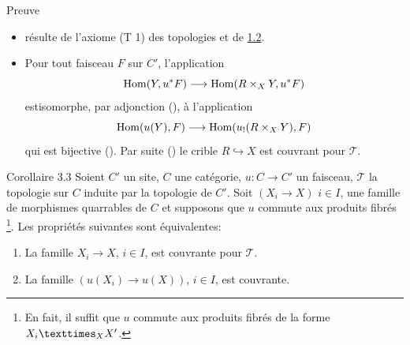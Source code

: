 \documentclass[10pt]{../fichiers-configuration-latex/smfart}
\begin{document}
\begin{enonce*}[remark]{Preuve}
\begin{itemize} %
\item[i) $\Rightarrow$ ii):] résulte de l'axiome (T 1) des topologies
  et de \hyperref[III.prop1.2]{1.2}.

\item[ii) $\Rightarrow$ i):] Pour tout faisceau $F$ sur $C'$,
  l'application
$$
\operatorname{Hom}(Y,u^{\ast}F)\longrightarrow \operatorname{Hom}(R\times_X Y, u^{\ast}F)
$$
est\pageoriginale isomorphe, par adjonction (), à
l'application
$$
\operatorname{Hom}(u(Y),F)\longrightarrow \operatorname{Hom}(u_{!}(R\times_X Y),F)
$$
qui est bijective (). Par suite ()
le crible $R\hookrightarrow X$ est couvrant pour $𝒯$.
\end{itemize}
\end{enonce*}

\begin{enonce*}{Corollaire 3.3}
Soient $C'$ un site, $C$ une catégorie, $u:C\rightarrow C'$ un
faisceau, $𝒯$ la topologie sur $C$ induite par la topologie de
$C'$. Soit $(X_i\rightarrow X)$ $i\in I$, une famille de morphismes
quarrables de $C$ et supposons que $u$ commute aux produits fibrés
\footnote[2]{En fait, il suffit que $u$ commute aux produits fibrés
  de la forme $\fprod{X_i}{X'}{X}$.}. Les propriétés suivantes
sont équivalentes:
\begin{enumerate}
\renewcommand{\theenumi}{\roman{enumi}}
\renewcommand{\labelenumi}{\theenumi)}
\item La famille $X_i\rightarrow X$, $i\in I$, est couvrante pour
  $𝒯$.

\item La famille $(u(X_i)\rightarrow u(X))$, $i\in I$, est couvrante.
\end{enumerate}
\end{enonce*}
\end{document}
